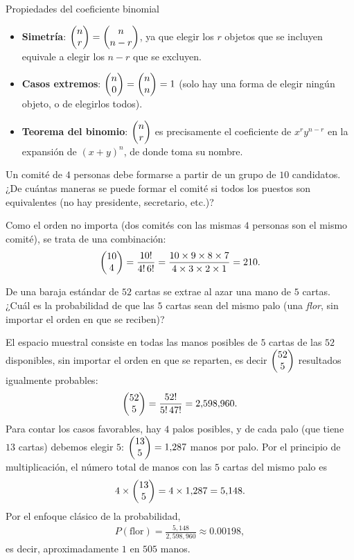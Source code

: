 {Propiedades del coeficiente binomial}
\begin{itemize}
	\item \textbf{Simetría}: $\begin{pmatrix} n \\ r\end{pmatrix} = \begin{pmatrix} n \\ n-r\end{pmatrix}$, ya que elegir los $r$ objetos que se incluyen equivale a elegir los $n-r$ que se excluyen.
	\item \textbf{Casos extremos}: $\begin{pmatrix} n \\ 0\end{pmatrix} = \begin{pmatrix} n \\ n\end{pmatrix} = 1$ (solo hay una forma de elegir ningún objeto, o de elegirlos todos).
	\item \textbf{Teorema del binomio}: $\begin{pmatrix} n \\ r\end{pmatrix}$ es precisamente el coeficiente de $x^r y^{n-r}$ en la expansión de $(x+y)^n$, de donde toma su nombre.
\end{itemize}

\begin{ejemplo}
	\label{exmp:conteo.3}
	Un comité de $4$ personas debe formarse a partir de un grupo de $10$ candidatos. ¿De cuántas maneras se puede formar el comité si todos los puestos son equivalentes (no hay presidente, secretario, etc.)?
\end{ejemplo}

\begin{solucion}
	Como el orden no importa (dos comités con las mismas $4$ personas son el mismo comité), se trata de una combinación:
	\begin{align}
		\begin{pmatrix} 10 \\ 4\end{pmatrix} = \frac{10!}{4! \, 6!} = \frac{10 \times 9 \times 8 \times 7}{4 \times 3 \times 2 \times 1} = 210.
	\end{align}
\end{solucion}

\begin{ejemplo}
	\label{exmp:conteo.4}
	De una baraja estándar de $52$ cartas se extrae al azar una mano de $5$ cartas. ¿Cuál es la probabilidad de que las $5$ cartas sean del mismo palo (una \emph{flor}, sin importar el orden en que se reciben)?
\end{ejemplo}

\begin{solucion}
	El espacio muestral consiste en todas las manos posibles de $5$ cartas de las $52$ disponibles, sin importar el orden en que se reparten, es decir $\begin{pmatrix} 52 \\ 5\end{pmatrix}$ resultados igualmente probables:
	\begin{align}
		\begin{pmatrix} 52 \\ 5\end{pmatrix} = \frac{52!}{5!\,47!} = 2{,}598{,}960.
	\end{align}
	Para contar los casos favorables, hay $4$ palos posibles, y de cada palo (que tiene $13$ cartas) debemos elegir $5$: $\begin{pmatrix} 13 \\ 5\end{pmatrix} = 1{,}287$ manos por palo. Por el principio de multiplicación, el número total de manos con las $5$ cartas del mismo palo es
	\begin{align}
		4 \times \begin{pmatrix} 13 \\ 5\end{pmatrix} = 4 \times 1{,}287 = 5{,}148.
	\end{align}
	Por el enfoque clásico de la probabilidad,
	\begin{align}
		P(\text{flor}) = \frac{5{,}148}{2{,}598{,}960} \approx 0.00198,
	\end{align}
	es decir, aproximadamente $1$ en $505$ manos.
\end{solucion}
